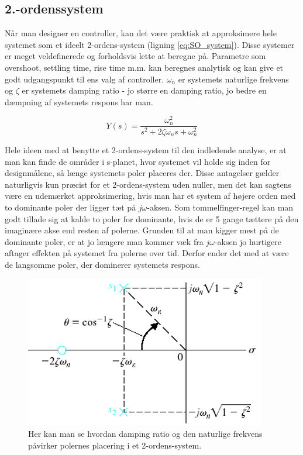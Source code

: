 \subsection{2.-ordenssystem}

Når man designer en controller, kan det være praktisk at approksimere hele systemet som et ideelt 2-ordens-system (ligning \eqref{eq:SO_system}). Disse systemer er meget veldefinerede og forholdsvis lette at beregne på. Parametre som overshoot, settling time, rise time m.m. kan beregnes analytisk og kan give et godt udgangspunkt til ens valg af controller. $\omega_{n}$ er systemets naturlige frekvens og $\zeta$ er systemets damping ratio - jo større en damping ratio, jo bedre en dæmpning af systemets respons har man.

\begin{equation}\label{eq:SO_system}
Y(s)=\frac{\omega_{n}^2}{s^2+2\zeta\omega_{n}s+\omega_{n}^2}
\end{equation}

Hele ideen med at benytte et 2-ordens-system til den indledende analyse, er at man kan finde de områder i s-planet, hvor systemet vil holde sig inden for designmålene, så længe systemets poler placeres der. Disse antagelser gælder naturligvis kun præcist for et 2-ordens-system uden nuller, men det kan sagtens være en udemærket approksimering, hvis man har et system af højere orden med to dominante poler der ligger tæt på $j\omega$-aksen. Som tommelfinger-regel kan man godt tillade sig at kalde to poler for dominante, hvis de er 5 gange tættere på den imaginære akse end resten af polerne. Grunden til at man kigger mest på de dominante poler, er at jo længere man kommer væk fra $j\omega$-aksen jo hurtigere aftager effekten på systemet fra polerne over tid. Derfor ender det med at være de langsomme poler, der dominerer systemets respons.

\begin{figure}[!ht]
	\centering
	\includegraphics[scale=0.5]{Billeder/Damping_Ratio.PNG}
	\caption{Her kan man se hvordan damping ratio og den naturlige frekvens påvirker polernes placering i et 2-ordens-system.}
	\label{fig:SO_system}
\end{figure}

